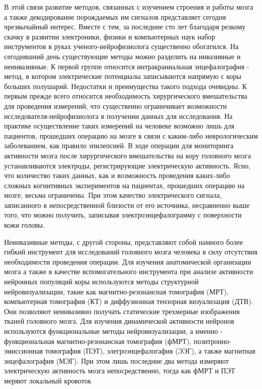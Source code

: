 В этой связи развитие методов, связанных с изучением строения и работы мозга а также декодирование
порождаемых им сигналов представляет сегодня чрезвычайный интерес.
Вместе с тем, за последние сто лет благодаря резкому скачку в развитии электроники,
физики и компьютерных наук набор инструментов в руках ученого-нейрофизиолога существенно обогатился.
На сегодняшний день существующие методы можно разделить на инвазивные и неинвазивные.
К первой группе относится интракраниальная энцефалография - метод,
в котором электрические потенциалы записываются напрямую с коры больших полушарий.
Недостатки и преимущества такого подхода очевидны. К первым прежде всего относится необходимость
хирургического вмешательства для проведения измерений, что существенно ограничивает возможности
исследователя-нейрофизиолога в получении данных для исследования.
На практике осуществление таких измерений на человеке возможно лишь для пациентов,
прошедших операцию на мозге в связи с каким-либо неврологическим заболеванием, как правило эпилепсией.
В ходе операции для мониторинга активности мозга после хирургического вмешательства на кору головного
мозга устанавливаются электроды, регистрирующие электрическую активность.
Ясно, что количество таких данных, как и  возможность проведения каких-либо сложных
когнитивных экспериментов на пациентах, прошедших операцию на мозге, весьма ограничены.
При этом качество электрического сигнала, записанного в непосредственной близости от его источника,
несравненно выше того, что можно получить, записывая электроэнцефалограмму с поверхности кожи головы.

Неинвазивные методы, с другой стороны, представляют собой намного более гибкий инструмент
для исследований головного мозга человека в силу отсутствия необходимости проведения операции.
Для изучения анатомической организации мозга а также в качестве вспомогательного инструмента
при анализе активности нейронных популяций коры используются методы структурной нейровизуализации,
такие как магнитно-резонансная томография (МРТ),
компьютерная томография (КТ) и диффузионная тензорная визуализация (ДТВ).
Они позволяют неинвазивно получать статические трехмерные изображения тканей головного мозга.
Для изучения динамической активности нейронов используются функциональные методы нейровизуализации,
а именно -  функциональная магнитно-резонансная томография (фМРТ),
позитронно-эмиссионная томография (ПЭТ), элегроэнцефалогафия (ЭЭГ), а также магнитная энцефалография (МЭГ).
При этом лишь последние два метода измеряют электрическую активность мозга непосредственно,
тогда как фМРТ и ПЭТ меряют локальный кровоток 

